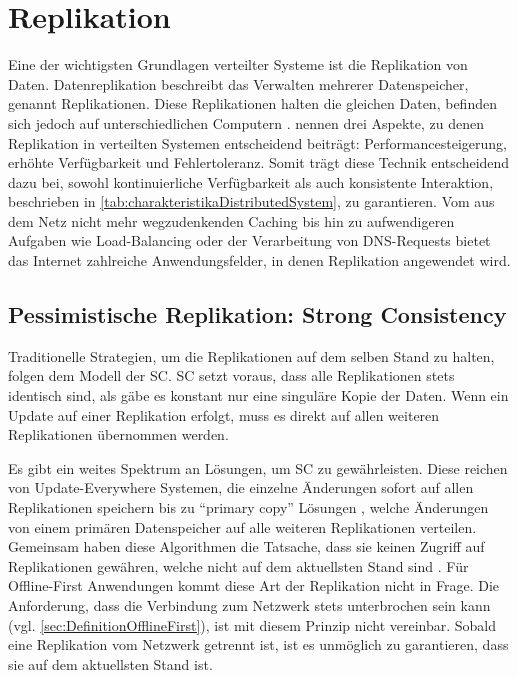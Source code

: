 \documentclass[a4paper, 12pt]{scrreprt}
\begin{document}
\section{Replikation}

Eine der wichtigsten Grundlagen verteilter Systeme ist die Replikation von Daten. Datenreplikation beschreibt das Verwalten mehrerer Datenspeicher, genannt Replikationen. Diese Replikationen halten die gleichen Daten, befinden sich jedoch auf unterschiedlichen Computern \autocite[S.42]{ArticleOptimisticReplication}. \citet{BookDistributedSystemsConceptsAndDesign} nennen drei Aspekte, zu denen Replikation in verteilten Systemen entscheidend beiträgt: Performancesteigerung, erhöhte Verfügbarkeit und Fehlertoleranz. Somit trägt diese Technik entscheidend dazu bei, sowohl kontinuierliche Verfügbarkeit als auch konsistente Interaktion, beschrieben in \ref{tab:charakteristikaDistributedSystem}, zu garantieren. Vom aus dem Netz nicht mehr wegzudenkenden Caching bis hin zu aufwendigeren Aufgaben wie Load-Balancing oder der Verarbeitung von DNS-Requests bietet das Internet zahlreiche Anwendungsfelder, in denen Replikation angewendet wird. 

\subsection{Pessimistische Replikation: Strong Consistency}

Traditionelle Strategien, um die Replikationen auf dem selben Stand zu halten, folgen dem Modell der \ac{SC}. \ac{SC} setzt voraus, dass alle Replikationen stets identisch sind, als gäbe es konstant nur eine singuläre Kopie der Daten. Wenn ein Update auf einer Replikation erfolgt, muss es direkt auf allen weiteren Replikationen übernommen werden. 

Es gibt ein weites Spektrum an Lösungen, um \ac{SC} zu gewährleisten. Diese reichen von {Update-Everywhere} Systemen, die einzelne Änderungen sofort auf allen Replikationen speichern \autocite{ThesisUpdateEverywhere} bis zu \enquote{primary copy} Lösungen \autocite[S.14]{BookPrimaryReplica}, welche Änderungen von einem primären Datenspeicher auf alle weiteren Replikationen verteilen. Gemeinsam haben diese Algorithmen die Tatsache, dass sie keinen Zugriff auf Replikationen gewähren, welche nicht auf dem aktuellsten Stand sind \autocite[S.43]{ArticleOptimisticReplication}. Für Offline-First Anwendungen kommt diese Art der Replikation nicht in Frage. Die Anforderung, dass die Verbindung zum Netzwerk stets unterbrochen sein kann (vgl. \ref{sec:DefinitionOfflineFirst}), ist mit diesem Prinzip nicht vereinbar. Sobald eine Replikation vom Netzwerk getrennt ist, ist es unmöglich zu garantieren, dass sie auf dem aktuellsten Stand ist.
\end{document}
